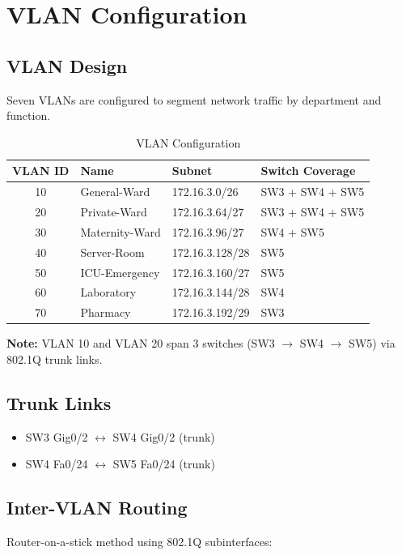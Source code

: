 \documentclass[12pt,a4paper]{report}
\begin{document}
\chapter{VLAN Configuration}

\section{VLAN Design}
Seven VLANs are configured to segment network traffic by department and function.

\begin{table}[H]
\centering
\caption{VLAN Configuration}
\label{tab:vlan}
\begin{tabular}{clll}
\toprule
\textbf{VLAN ID} & \textbf{Name} & \textbf{Subnet} & \textbf{Switch Coverage} \\
\midrule
10 & General-Ward & 172.16.3.0/26 & SW3 + SW4 + SW5 \\
20 & Private-Ward & 172.16.3.64/27 & SW3 + SW4 + SW5 \\
30 & Maternity-Ward & 172.16.3.96/27 & SW4 + SW5 \\
40 & Server-Room & 172.16.3.128/28 & SW5 \\
50 & ICU-Emergency & 172.16.3.160/27 & SW5 \\
60 & Laboratory & 172.16.3.144/28 & SW4 \\
70 & Pharmacy & 172.16.3.192/29 & SW3 \\
\bottomrule
\end{tabular}
\end{table}

\textbf{Note:} VLAN 10 and VLAN 20 span 3 switches (SW3 $\rightarrow$ SW4 $\rightarrow$ SW5) via 802.1Q trunk links.

\section{Trunk Links}
\begin{itemize}[noitemsep]
    \item SW3 Gig0/2 $\leftrightarrow$ SW4 Gig0/2 (trunk)
    \item SW4 Fa0/24 $\leftrightarrow$ SW5 Fa0/24 (trunk)
\end{itemize}

\section{Inter-VLAN Routing}
Router-on-a-stick method using 802.1Q subinterfaces:
\end{document}
